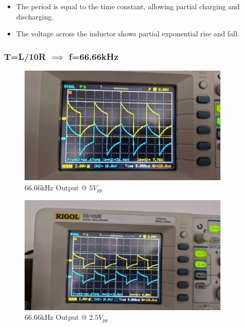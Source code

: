 \begin{itemize}
    \item The period is equal to the time constant, allowing partial charging and discharging.
    \item The voltage across the inductor shows partial exponential rise and fall.
\end{itemize}

\newpage{}
\thispagestyle{plain}

\subsubsection{T=L/10R $\implies$ f=66.66kHz}

\begin{figure}[h]
    \centering
    \includegraphics[width=0.9\textwidth]{assets/66666-hz-5vpp.jpg}
    \caption{66.66kHz Output @ $5V_{pp}$}
    \label{fig:66666-hz-5vpp-output}
\end{figure}

\begin{figure}[h]
    \centering
    \includegraphics[width=0.9\textwidth]{assets/66666-hz-2.5vpp.jpg}
    \caption{66.66kHz Output @ $2.5V_{pp}$}
    \label{fig:66666-hz-2.5vpp-output}
\end{figure}

